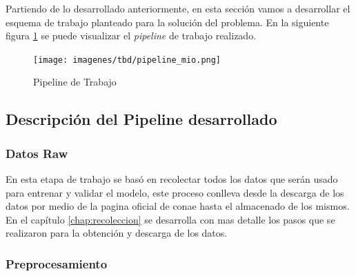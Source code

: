 Partiendo de lo desarrollado anteriormente, en esta sección vamos a desarrollar el esquema de trabajo planteado para la solución del problema. En la siguiente figura \ref{Fig:pipeline-mio} se puede visualizar el \textit{pipeline} de trabajo realizado.

\begin{figure}[H] \centering
  \texttt{[image: imagenes/tbd/pipeline\_mio.png]}
  \caption{Pipeline de Trabajo}\label{Fig:pipeline-mio}
\end{figure}

\subsection{Descripción del Pipeline desarrollado}\label{sub:desc-pipeline}

\subsubsection*{Datos Raw}
En esta etapa de trabajo se basó en recolectar todos los datos que serán usado para entrenar y validar el modelo, este proceso conlleva desde la descarga de los datos por medio de la pagina oficial de \ac{conae} hasta el almacenado de los mismos. En el capítulo \ref{chap:recoleccion} se desarrolla con mas detalle los pasos que se realizaron para la obtención y descarga de los datos.



%
\subsubsection*{Preprocesamiento}

